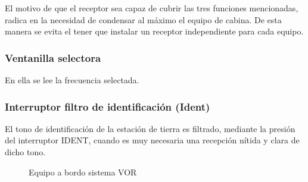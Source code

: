 El motivo de que el receptor sea capaz de cubrir las tres funciones mencionadas, radica en la necesidad de condensar al máximo el equipo de cabina. De esta manera se evita el tener que instalar un receptor independiente para cada equipo.

\subsubsection{Ventanilla selectora}
En ella se lee la frecuencia selectada.

\subsubsection{Interruptor filtro de identificación (Ident)}
El tono de identificación de la estación de tierra es filtrado, mediante la presión del interruptor IDENT, cuando es muy necesaria una recepción nítida y clara de dicho tono.

\begin{figure}[!hb]
  \centering
  \caption{Equipo a bordo sistema VOR}
\end{figure}


